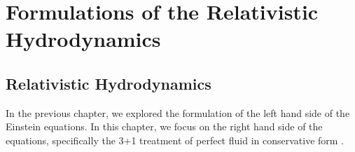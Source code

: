 
\chapter{Formulations of the Relativistic Hydrodynamics}  %

\ifpdf
    \graphicspath{{Chapter2/Figs/PDF/}{Chapter2/Figs/}}
\else
    \graphicspath{{Chapter2/Figs/}}
\fi


\section{Relativistic Hydrodynamics} %
In the previous chapter, we explored the formulation of the left hand side of the Einstein equations.
In this chapter, we focus on the right hand side of the equations,
specifically the 3+1 treatment of perfect fluid in conservative form \cite{marti1991numerical,rezzolla2013relativistic}.

